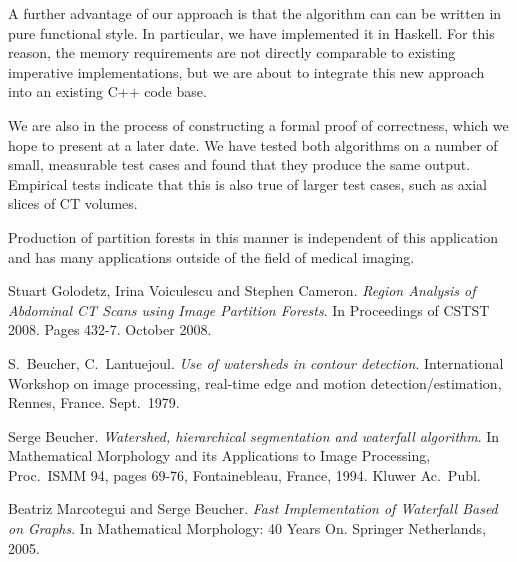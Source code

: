 \documentclass{jfp}
\begin{document}
A further advantage of our approach is that the algorithm can can be
written in pure functional style. In particular, we have implemented
it in Haskell. For this reason, the memory requirements are not
directly comparable to existing imperative implementations, but we are
about to integrate this new approach into an existing C++ code base.

We are also in the process of constructing a formal proof of
correctness, which we hope to present at a later date. We have tested
both algorithms on a number of small, measurable test cases and found
that they produce the same output. Empirical tests indicate that this
is also true of larger test cases, such as axial slices of CT volumes.

Production of partition forests in this manner is independent of this
application and has many applications outside of the field of medical
imaging.


\begin{thebibliography}{99}

 Stuart Golodetz, Irina Voiculescu
  and Stephen Cameron.  {\em Region Analysis of Abdominal CT Scans
    using Image Partition Forests}. In Proceedings of CSTST
  2008. Pages 432-7. October 2008.

 S.\ Beucher, C.\ Lantuejoul. {\em
  Use of watersheds in contour detection}. International Workshop on
  image processing, real-time edge and motion detection/estimation,
  Rennes, France. Sept.\ 1979.

 Serge Beucher. {\em Watershed,
  hierarchical segmentation and waterfall algorithm}. In Mathematical
  Morphology and its Applications to Image Processing, Proc.\ ISMM 94,
  pages 69-76, Fontainebleau, France, 1994. Kluwer Ac.\ Publ.

 Beatriz Marcotegui and Serge Beucher. {\em Fast
  Implementation of Waterfall Based on Graphs}. In {Mathematical
  Morphology: 40 Years On}. Springer Netherlands, 2005.

\end{thebibliography}
\end{document}
